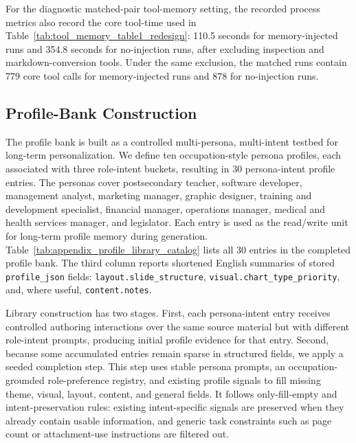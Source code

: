 

For the diagnostic matched-pair tool-memory setting, the recorded process metrics
also record the core tool-time used in Table~\ref{tab:tool_memory_table1_redesign}:
110.5 seconds for memory-injected runs and 354.8 seconds for no-injection runs,
after excluding inspection and markdown-conversion tools. Under the same
exclusion, the matched runs contain 779 core tool calls for memory-injected
runs and 878 for no-injection runs.

\subsection{Profile-Bank Construction}
\label{app:profile_bank_construction}

The profile bank is built as a controlled multi-persona, multi-intent
testbed for long-term personalization. We define ten occupation-style persona
profiles, each associated with three role-intent buckets, resulting in 30
persona-intent profile entries. The personas cover postsecondary teacher,
software developer, management analyst, marketing manager, graphic designer,
training and development specialist, financial manager, operations manager,
medical and health services manager, and legislator. Each entry is used as the
read/write unit for long-term profile memory during generation.
Table~\ref{tab:appendix_profile_library_catalog} lists all 30 entries in the
completed profile bank. The third column reports shortened English summaries
of stored \texttt{profile\_json} fields: \texttt{layout.slide\_structure},
\texttt{visual.chart\_type\_priority}, and, where useful,
\texttt{content.notes}.



Library construction has two stages. First, each persona-intent entry receives
controlled authoring interactions over the same source material but with
different role-intent prompts, producing initial profile evidence for that
entry. Second, because some accumulated entries remain sparse in structured
fields, we apply a seeded completion step. This step uses stable persona
prompts, an occupation-grounded role-preference registry, and existing profile
signals to fill missing theme, visual, layout, content, and general fields. It
follows only-fill-empty and intent-preservation rules: existing intent-specific
signals are preserved when they already contain usable information, and generic
task constraints such as page count or attachment-use instructions are filtered
out.

